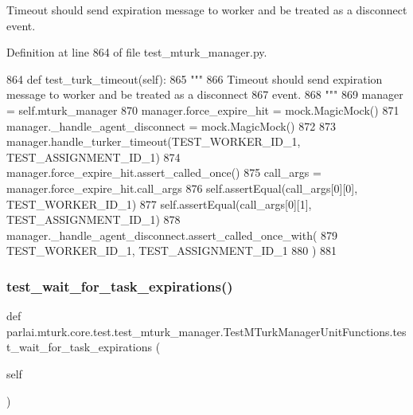 \begin{DoxyVerb}Timeout should send expiration message to worker and be treated as a disconnect
event.
\end{DoxyVerb}
 

Definition at line 864 of file test\+\_\+mturk\+\_\+manager.\+py.


\begin{DoxyCode}
864     \textcolor{keyword}{def }test\_turk\_timeout(self):
865         \textcolor{stringliteral}{"""}
866 \textcolor{stringliteral}{        Timeout should send expiration message to worker and be treated as a disconnect}
867 \textcolor{stringliteral}{        event.}
868 \textcolor{stringliteral}{        """}
869         manager = self.mturk\_manager
870         manager.force\_expire\_hit = mock.MagicMock()
871         manager.\_handle\_agent\_disconnect = mock.MagicMock()
872 
873         manager.handle\_turker\_timeout(TEST\_WORKER\_ID\_1, TEST\_ASSIGNMENT\_ID\_1)
874         manager.force\_expire\_hit.assert\_called\_once()
875         call\_args = manager.force\_expire\_hit.call\_args
876         self.assertEqual(call\_args[0][0], TEST\_WORKER\_ID\_1)
877         self.assertEqual(call\_args[0][1], TEST\_ASSIGNMENT\_ID\_1)
878         manager.\_handle\_agent\_disconnect.assert\_called\_once\_with(
879             TEST\_WORKER\_ID\_1, TEST\_ASSIGNMENT\_ID\_1
880         )
881 
\end{DoxyCode}
\mbox{\label{classparlai_1_1mturk_1_1core_1_1test_1_1test__mturk__manager_1_1TestMTurkManagerUnitFunctions_a5d1bc0457f0f695982606756490050ee}} 
\subsubsection{\texorpdfstring{test\+\_\+wait\+\_\+for\+\_\+task\+\_\+expirations()}{test\_wait\_for\_task\_expirations()}}
{\footnotesize\ttfamily def parlai.\+mturk.\+core.\+test.\+test\+\_\+mturk\+\_\+manager.\+Test\+M\+Turk\+Manager\+Unit\+Functions.\+test\+\_\+wait\+\_\+for\+\_\+task\+\_\+expirations (\begin{DoxyParamCaption}\item[{}]{self }\end{DoxyParamCaption})}

